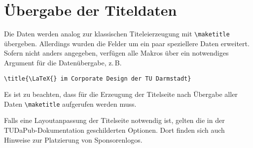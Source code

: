 \documentclass[
	german,%
	ruledheaders=section,%
	class=report,%
	thesis={type=bachelor},%
	accentcolor=9c,%
	custommargins=true,%
	marginpar=false,%
	parskip=half-,%
	fontsize=11pt,%
]{tudapub}
\begin{document}
\section{Übergabe der Titeldaten}

Die Daten werden analog zur klassischen Titeleierzeugung mit \verb+\maketitle+ übergeben. Allerdings wurden die Felder um ein paar speziellere Daten erweitert. Sofern nicht anders angegeben, verfügen alle Makros über ein notwendiges Argument für die Datenübergabe, z.\,B.
\begin{verbatim}
\title{\LaTeX{} im Corporate Design der TU Darmstadt}
\end{verbatim}
Es ist zu beachten, dass für die Erzeugung der Titelseite nach Übergabe aller Daten \verb+\maketitle+ aufgerufen werden muss.

Falls eine Layoutanpassung der Titelseite notwendig ist, gelten die in der TUDaPub-Dokumentation geschilderten Optionen. Dort finden sich auch Hinweise zur Platzierung von Sponsorenlogos. \cite{tudapub}
\end{document}
